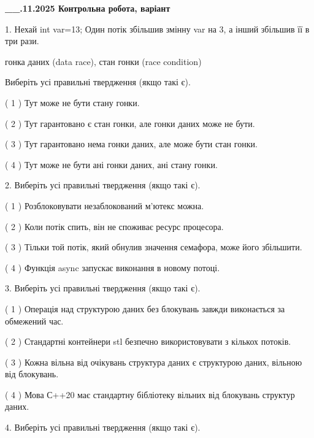 \documentclass[12pt, ukrainian]{article}
\begin{document}
\newpage
\begin {large}

\textbf{\_\_.11.2025 Контрольна робота, варіант  }\par


{
1. Нехай int var=13; Один потік збільшив змінну var на 3, а інший збільшив її в три рази.

гонка даних (data race), стан гонки (race condition)

Виберіть усі правильні твердження (якщо такі є).\par
\vspace{2mm}
( 1 ) Тут може не бути стану гонки.%

( 2 ) Тут гарантовано є стан гонки, але гонки даних може не бути.%

( 3 ) Тут гарантовано нема гонки даних, але може бути стан гонки.%

( 4 ) Тут може не бути ані гонки даних, ані стану гонки.%


2. Виберіть усі правильні твердження (якщо такі є).\par
\vspace{2mm}

( 1 ) Розблоковувати незаблокований м’ютекс можна.%

( 2 ) Коли потік спить, він не споживає ресурс процесора.%

( 3 ) Тільки той потік, який обнулив значення семафора, може його збільшити.%

( 4 ) Функція async запускає виконання в новому потоці.%


3. Виберіть усі правильні твердження (якщо такі є).\par
\vspace{2mm}

( 1 ) Операція над структурою даних без блокувань завжди виконається за обмежений час.%

( 2 ) Стандартні контейнери stl безпечно використовувати з кількох потоків.%

( 3 ) Кожна вільна від очікувань структура даних є структурою даних, вільною від блокувань.%

( 4 ) Мова С++20 має стандартну бібліотеку вільних від блокувань структур даних.%


4. Виберіть усі правильні твердження (якщо такі є).\par
\vspace{2mm}

}
\end{large}
\end{document}
